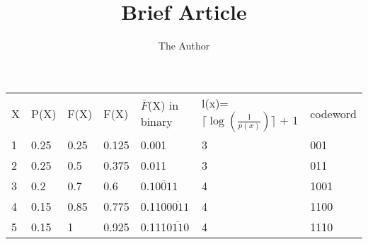 \documentclass[11pt]{amsart}
\title{Brief Article}
\author{The Author}
\begin{document}
\begin{multicols}{4}

\maketitle
\begin{table*}[htbp]
   \centering
   \begin{tabular}{@{} | l | l | l | l | l | l | l | @{}} %
      X & P(X) & F(X)  & F(X) & $\bar{F}$(X) in binary & l(x)= $\lceil \log(\frac{1}{p(x)}) \rceil$ + 1 & codeword  \\
      1 & 0.25 & 0.25 & 0.125 & 0.001 & 3 & 001\\ 
      2 & 0.25 & 0.5 & 0.375 & 0.011 & 3 & 011\\ 
      3 & 0.2 & 0.7 & 0.6 & 0.$\overline{10011}$ & 4 & 1001\\ 
      4 & 0.15 & 0.85 & 0.775 & 0.110$\overline{0011}$ & 4 & 1100\\ 
      5 & 0.15 & 1 & 0.925 & 0.111$\overline{0110}$ & 4 & 1110\\             
   \end{tabular}
\end{table*}
\end{multicols}
\end{document}
